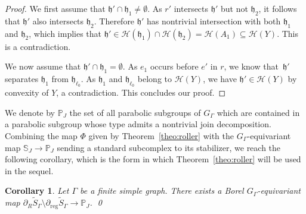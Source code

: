 \documentclass[11pt]{article}
\numberwithin{equation}{section}
\let\mathcal\mathscr
\theoremstyle{plain}
\newtheorem{cor}[theo]{Corollary}
\theoremstyle{definition}
\newcommand{\calh}{\mathcal{H}}
\newcommand{\reg}{\mathrm{reg}}
\begin{document}
\begin{proof}
We first assume that $\mathfrak h'\cap \mathfrak h_1\neq\emptyset$. As $r'$ intersects $\mathfrak h'$ but not $\mathfrak{h}_2$, it follows that $\mathfrak{h}'$ also intersects $\mathfrak{h}_2$. Therefore $\mathfrak{h}'$ has nontrivial intersection with both $\mathfrak h_1$ and $\mathfrak h_2$, which implies that $\mathfrak h'\in\calh(\mathfrak h_1)\cap \calh(\mathfrak h_2)=\calh(A_1)\subseteq\calh(Y)$. This is a contradiction.

We now assume that $\mathfrak h'\cap \mathfrak h_1=\emptyset$. As $e_1$ occurs before $e'$ in $r$, we know that~$\mathfrak h'$ separates $\mathfrak h_1$ from $\mathfrak h_{\ell_0}$. As $\mathfrak h_1$ and $\mathfrak h_{\ell_0}$ belong to $\calh(Y)$, we have $\mathfrak h'\in \calh(Y)$ by convexity of $Y$, a contradiction. This concludes our proof.
\end{proof}

We denote by $\mathbb P_J$ the set of all parabolic subgroups of $G_\Gamma$ which are contained in a parabolic subgroup whose type admits a nontrivial join decomposition. Combining the map $\Phi$ given by Theorem~\ref{theo:roller} with the $G_\Gamma$-equivariant map $\mathbb{S}_J\to\mathbb{P}_J$ sending a standard subcomplex to its stabilizer, we reach the following corollary, which is the form in which Theorem~\ref{theo:roller} will be used in the sequel.

\begin{cor}\label{cor:roller}
Let $\Gamma$ be a finite simple graph. There exists a Borel $G_\Gamma$-equivariant map $\partial_R\widetilde{S}_\Gamma\setminus\partial_\reg\widetilde{S}_\Gamma\to\mathbb{P}_J$.
\qed
\end{cor}
\end{document}
